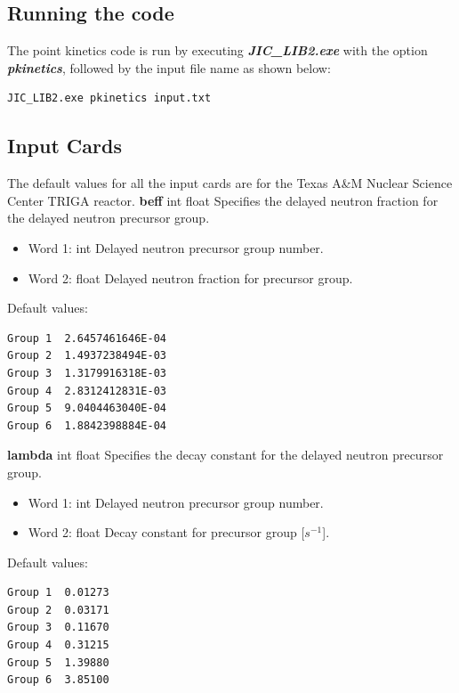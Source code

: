 \documentclass[11pt,letterpaper,titlepage]{article}
\begin{document}
\subsection{Running the code}
The point kinetics code is run by executing \textbf{\textit{JIC\_LIB2.exe }} with the option \textbf{\textit{pkinetics}}, followed by the input file name as shown below: 
\begin{verbatim}
JIC_LIB2.exe pkinetics input.txt
\end{verbatim}

\subsection{Input Cards}
The default values for all the input cards are for the Texas A\&M Nuclear Science Center TRIGA reactor.\newline
\newline
\textbf{beff} {\color{blue} int float} \newline
Specifies the delayed neutron fraction for the delayed neutron precursor group.
\begin{itemize}
	\item Word 1: {\color{blue} int} Delayed neutron precursor group number.
	\item Word 2: {\color{blue} float} Delayed neutron fraction for precursor group.
\end{itemize}
Default values:
\begin{verbatim}
Group 1  2.6457461646E-04 
Group 2  1.4937238494E-03 
Group 3  1.3179916318E-03 
Group 4  2.8312412831E-03 
Group 5  9.0404463040E-04 
Group 6  1.8842398884E-04
\end{verbatim}
\vspace {0.5 cm}

\newpage
\noindent
\textbf{lambda} {\color{blue} int float} \newline
Specifies the decay constant for the delayed neutron precursor group.
\begin{itemize}
	\item Word 1: {\color{blue} int} Delayed neutron precursor group number.
	\item Word 2: {\color{blue} float} Decay constant for precursor group [$s^{-1}$].
\end{itemize}
Default values:
\begin{verbatim}
Group 1  0.01273 
Group 2  0.03171 
Group 3  0.11670 
Group 4  0.31215 
Group 5  1.39880 
Group 6  3.85100 
\end{verbatim}
\vspace {0.5 cm}
\end{document}
